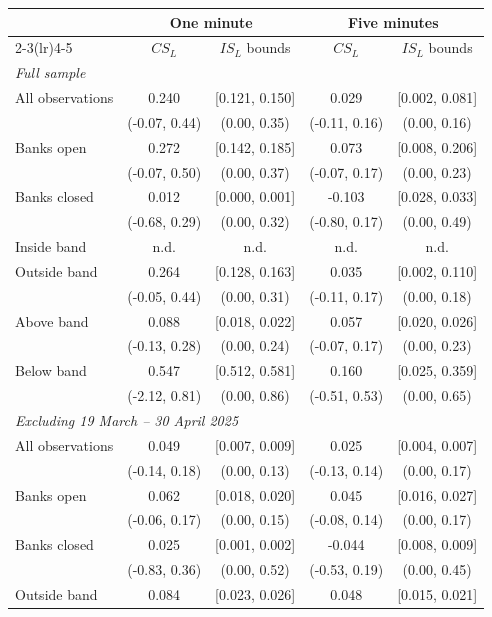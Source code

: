 \begin{tabular}{lcccc}
\toprule
 & \multicolumn{2}{c}{One minute} & \multicolumn{2}{c}{Five minutes} \\
\cmidrule(lr){2-3}\cmidrule(lr){4-5}
 & $CS_L$ & $IS_L$ bounds & $CS_L$ & $IS_L$ bounds \\
\midrule
\multicolumn{5}{l}{\emph{Full sample}} \\
All observations & 0.240 & [0.121, 0.150] & 0.029 & [0.002, 0.081] \\
 & (-0.07, 0.44) & (0.00, 0.35) & (-0.11, 0.16) & (0.00, 0.16) \\
Banks open & 0.272 & [0.142, 0.185] & 0.073 & [0.008, 0.206] \\
 & (-0.07, 0.50) & (0.00, 0.37) & (-0.07, 0.17) & (0.00, 0.23) \\
Banks closed & 0.012 & [0.000, 0.001] & -0.103 & [0.028, 0.033] \\
 & (-0.68, 0.29) & (0.00, 0.32) & (-0.80, 0.17) & (0.00, 0.49) \\
Inside band & n.d. & n.d. & n.d. & n.d. \\
Outside band & 0.264 & [0.128, 0.163] & 0.035 & [0.002, 0.110] \\
 & (-0.05, 0.44) & (0.00, 0.31) & (-0.11, 0.17) & (0.00, 0.18) \\
Above band & 0.088 & [0.018, 0.022] & 0.057 & [0.020, 0.026] \\
 & (-0.13, 0.28) & (0.00, 0.24) & (-0.07, 0.17) & (0.00, 0.23) \\
Below band & 0.547 & [0.512, 0.581] & 0.160 & [0.025, 0.359] \\
 & (-2.12, 0.81) & (0.00, 0.86) & (-0.51, 0.53) & (0.00, 0.65) \\
\multicolumn{5}{l}{\emph{Excluding 19 March -- 30 April 2025}} \\
All observations & 0.049 & [0.007, 0.009] & 0.025 & [0.004, 0.007] \\
 & (-0.14, 0.18) & (0.00, 0.13) & (-0.13, 0.14) & (0.00, 0.17) \\
Banks open & 0.062 & [0.018, 0.020] & 0.045 & [0.016, 0.027] \\
 & (-0.06, 0.17) & (0.00, 0.15) & (-0.08, 0.14) & (0.00, 0.17) \\
Banks closed & 0.025 & [0.001, 0.002] & -0.044 & [0.008, 0.009] \\
 & (-0.83, 0.36) & (0.00, 0.52) & (-0.53, 0.19) & (0.00, 0.45) \\
Outside band & 0.084 & [0.023, 0.026] & 0.048 & [0.015, 0.021] \\

\end{tabular}

